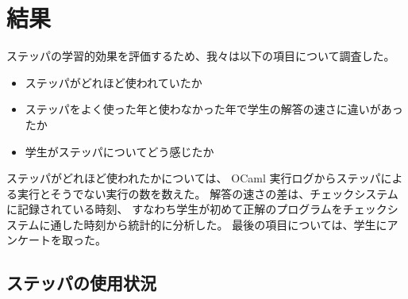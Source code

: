 \section{結果}
\label{section:experiment__result}

ステッパの学習的効果を評価するため、我々は以下の項目について調査した。

\begin{itemize}
\item ステッパがどれほど使われていたか
\item ステッパをよく使った年と使わなかった年で学生の解答の速さに違いがあったか
\item 学生がステッパについてどう感じたか
\end{itemize}

ステッパがどれほど使われたかについては、 OCaml 実行ログからステッパによる実行とそうでない実行の数を数えた。
解答の速さの差は、チェックシステムに記録されている時刻、
すなわち学生が初めて正解のプログラムをチェックシステムに通した時刻から統計的に分析した。
最後の項目については、学生にアンケートを取った。

\subsection{ステッパの使用状況}
\label{subsection:result__uses}

